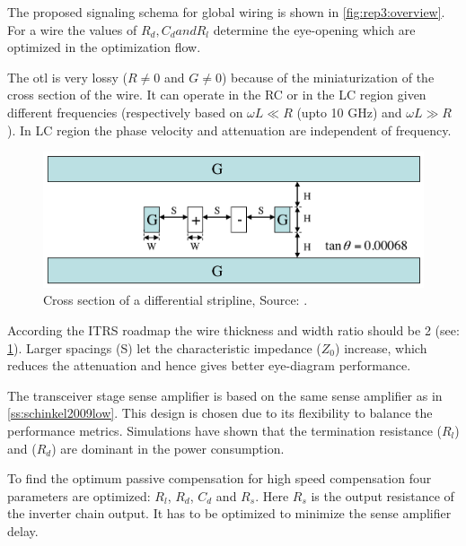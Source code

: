 \summary
The proposed signaling schema for global wiring is shown in \cref{fig:rep3:overview}.
For a wire the values of $R_{d}, C_{d} and R_{l}$ determine the eye-opening which are optimized in the optimization flow.

The \ac{otl} is very lossy ($R \neq 0$ and $G \neq 0$) because of the miniaturization of the cross section of the wire.
It can operate in the RC or in the LC region given different frequencies (respectively based on $\omega L \ll R$ (upto 10 GHz) and $\omega L \gg R$).
In LC region the phase velocity and attenuation are independent of frequency.

\begin{figure}
	\centering
	\includegraphics[width=0.95\linewidth]{Figures/Rep3TransmissionLine.png}
	\caption{Cross section of a differential stripline, Source: \cite{zhang2009high}.} 
    \label{fig:rep3:crosssection}
\end{figure}
According the ITRS roadmap the wire thickness and width ratio should be 2 (see: \cref{fig:rep3:crosssection}).
Larger spacings (S) let the characteristic impedance ($Z_{0}$) increase, which reduces the attenuation and hence gives better eye-diagram performance. %

The transceiver stage sense amplifier is based on the same sense amplifier as in \cref{ss:schinkel2009low}.
This design is chosen due to its flexibility to balance the performance metrics.
Simulations have shown that the termination resistance ($R_{l}$) and ($R_{d}$) are dominant in the power consumption.

To find the optimum passive compensation for high speed compensation four parameters are optimized: $R_{l}$, $R_{d}$, $C_{d}$ and $R_{s}$.
Here $R_{s}$ is the output resistance of the inverter chain output.
It has to be optimized to minimize the sense amplifier delay.

